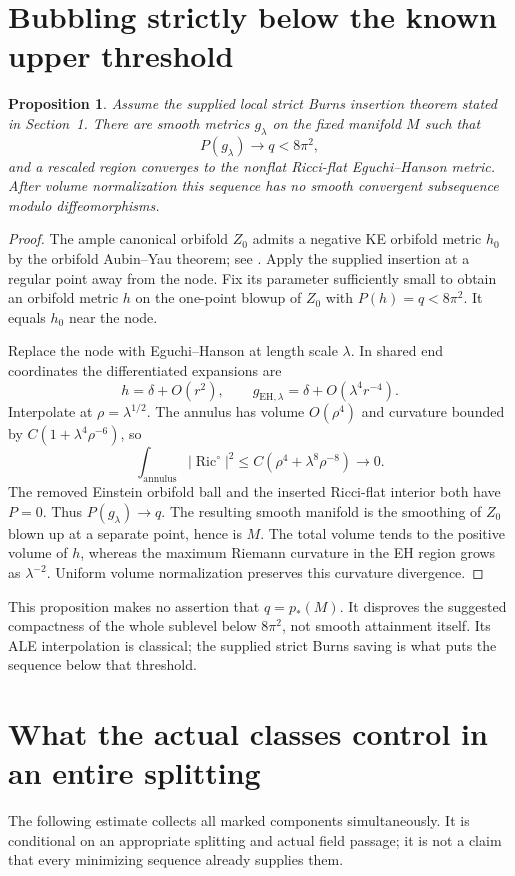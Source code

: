 \documentclass[11pt]{article}
\newtheorem{proposition}{Proposition}
\newcommand{\Ric}{\operatorname{Ric}}
\begin{document}
\section{Bubbling strictly below the known upper threshold}
\begin{proposition}\label{prop:bubble}
Assume the supplied local strict Burns insertion theorem stated in
Section~1. There are smooth metrics $g_\lambda$ on the fixed manifold $M$
such that
\[
 P(g_\lambda)\longrightarrow q<8\pi^2,
\]
and a rescaled region converges to the nonflat Ricci-flat
Eguchi--Hanson metric. After volume normalization this sequence has no
smooth convergent subsequence modulo diffeomorphisms.
\end{proposition}
\begin{proof}
The ample canonical orbifold $Z_0$ admits a negative KE orbifold metric
$h_0$ by the orbifold Aubin--Yau theorem; see \cite{Kobayashi,Suvaina}.
Apply the supplied insertion at a regular point away from the node.
Fix its parameter sufficiently small to obtain an orbifold metric $h$
on the one-point blowup of $Z_0$ with $P(h)=q<8\pi^2$. It equals $h_0$
near the node.

Replace the node with Eguchi--Hanson at length scale $\lambda$. In shared
end coordinates the differentiated expansions are
\[
 h=\delta+O(r^2),\qquad
 g_{\mathrm{EH},\lambda}=\delta+O(\lambda^4r^{-4}).
\]
Interpolate at $\rho=\lambda^{1/2}$. The annulus has volume $O(\rho^4)$
and curvature bounded by $C(1+\lambda^4\rho^{-6})$, so
\[
 \int_{\mathrm{annulus}}|\Ric^\circ|^2
 \le C(\rho^4+\lambda^8\rho^{-8})\longrightarrow0.
\]
The removed Einstein orbifold ball and the inserted Ricci-flat interior
both have $P=0$. Thus $P(g_\lambda)\to q$. The resulting smooth manifold
is the smoothing of $Z_0$ blown up at a separate point, hence is $M$.
The total volume tends to the positive volume of $h$, whereas the maximum
Riemann curvature in the EH region grows as $\lambda^{-2}$. Uniform
volume normalization preserves this curvature divergence.
\end{proof}

This proposition makes no assertion that $q=p_*(M)$. It disproves the
suggested compactness of the whole sublevel below $8\pi^2$, not smooth
attainment itself. Its ALE interpolation is classical; the supplied strict
Burns saving is what puts the sequence below that threshold.

\section{What the actual classes control in an entire splitting}
The following estimate collects all marked components simultaneously.
It is conditional on an appropriate splitting and actual field passage;
it is not a claim that every minimizing sequence already supplies them.
\end{document}
